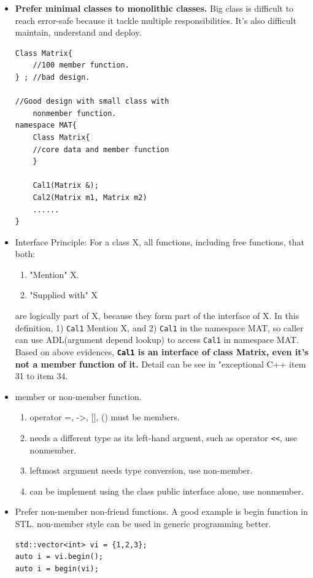 \documentclass[a4paper,11pt,twoside]{book}
\begin{document}
\begin{itemize}
	\item \textbf{Prefer minimal classes to monolithic classes.} Big class is difficult to reach error-safe because it tackle multiple responsibilities. It's also difficult maintain, understand and deploy.
\begin{lstlisting}[numbers=none]
Class Matrix{
	//100 member function.
} ; //bad design.
	
//Good design with small class with
	nonmember function.
namespace MAT{
	Class Matrix{
	//core data and member function
	}
	
	Cal1(Matrix &);
	Cal2(Matrix m1, Matrix m2)
	......
}
\end{lstlisting}

	\item Interface Principle: For a class X, all functions, including free functions, that both:
	\begin{enumerate}
		\item "Mention" X.
		\item "Supplied with" X
	\end{enumerate}
	are logically part of X, because they form part of the interface of X.  In this definition, 1) \texttt{Cal1} Mention X,  and 2) \texttt{Cal1} in the namespace MAT, so caller can use ADL(argument depend lookup) to access \texttt{Cal1} in namespace MAT. Based on above evidences, \textbf{\texttt{Cal1} is an interface of class Matrix, even it's not a member function of it.} Detail can be see in "exceptional C++ item 31 to item 34.
	
	\item member or non-member function.
	\begin{enumerate}
		\item operator =, ->, [], () must be members.
		\item needs a different type as its left-hand arguent, such as operator \verb=<<=, use nonmember.
		\item leftmost argument needs type conversion, use non-member.
		\item can be implement using the class public interface alone, use nonmember.
	\end{enumerate}

	\item Prefer non-member non-friend functions. A good example is begin function in STL. non-member style can be used in generic programming better.  
\begin{lstlisting}[numbers=none]
std::vector<int> vi = {1,2,3};
auto i = vi.begin();
auto i = begin(vi);
\end{lstlisting}
	
\end{itemize}
\end{document}
